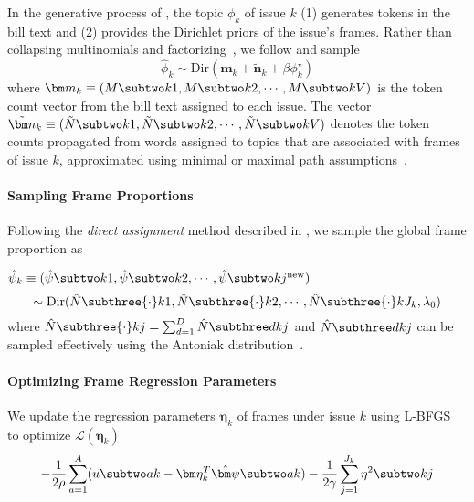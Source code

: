 In the generative process of \name{}, the topic $\phi_k$ of issue $k$ (1)
generates tokens in the bill text and (2) provides the Dirichlet priors of the
issue's frames. Rather than collapsing multinomials and factorizing~\cite{hu-12:fttm},
we follow  and sample
\begin{equation}
  \hat{\phi}_k \sim \mbox{Dir} (\bm m_k + \tilde{\bm n}_k + \beta \phi_k^{\star})
  \label{eq:phi_samp}
\end{equation}
where $\bm m_k \equiv (M \subtwo k1, M \subtwo k2, \cdots, M \subtwo
kV)$ is the token count vector from the bill text assigned to each
issue. The vector $\tilde{\bm n}_k \equiv (\tilde{N} \subtwo k1,
\tilde{N} \subtwo k2, \cdots, \tilde{N} \subtwo kV)$ denotes the token
counts propagated from words assigned to topics that are associated
with frames of issue $k$, approximated using minimal or maximal path
assumptions~\cite{Cowans:PhD06,Wallach:PhD08}.

\paragraph{Sampling Frame Proportions}

Following the \textit{direct assignment} method described in , we sample the global frame proportion as 

$\hat{\psi}_k \equiv (\hat{\psi} \subtwo k1, \hat{\psi} \subtwo k2, \cdots, \hat{\psi} \subtwo k{j^{\mbox{\scriptsize new}}})$
\begin{equation}
 \sim \mbox{Dir} (\hat{N} \subthree {\cdot}k1, \hat{N} \subthree {\cdot}k2,
 \cdots, \hat{N} \subthree {\cdot}k{J_k}, \lambda_0)
\end{equation}
where $\hat{N} \subthree {\cdot}kj = \sum_{d=1}^D \hat{N} \subthree dkj$ and $\hat{N} \subthree
dkj$ can be sampled effectively using the Antoniak distribution~\cite{Aantoniak:AS74}.






\paragraph{Optimizing Frame Regression Parameters}
\label{subsec:c6_upadte_eta}

We update the regression parameters $\bm \eta_k$ of frames under issue $k$ using
L-BFGS~\cite{Liu:MP89:lbfgs} to optimize $\mathcal{L}(\bm \eta_k)$
\begin{equation}
  - \frac{1}{2 \rho} \sum_{a=1}^A (u \subtwo ak - \bm \eta_k^T \hat{\bm \psi} \subtwo ak)
  - \frac{1}{2 \gamma} \sum_{j=1}^{J_k} \eta^2 \subtwo kj
\end{equation}

